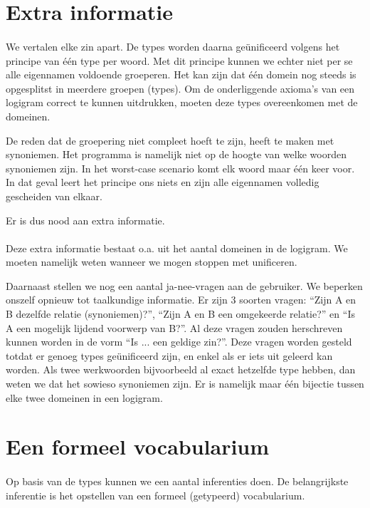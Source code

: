 \section{Extra informatie}
\paragraph{} We vertalen elke zin apart. De types worden daarna geünificeerd volgens het principe van één type per woord. Met dit principe kunnen we echter niet per se alle eigennamen voldoende groeperen. Het kan zijn dat één domein nog steeds is opgesplitst in meerdere groepen (types). Om de onderliggende axioma's van een logigram correct te kunnen uitdrukken, moeten deze types overeenkomen met de domeinen.

De reden dat de groepering niet compleet hoeft te zijn, heeft te maken met synoniemen. Het programma is namelijk niet op de hoogte van welke woorden synoniemen zijn. In het worst-case scenario komt elk woord maar één keer voor. In dat geval leert het principe ons niets en zijn alle eigennamen volledig gescheiden van elkaar.

Er is dus nood aan extra informatie.

\paragraph{} Deze extra informatie bestaat o.a. uit het aantal domeinen in de logigram. We moeten namelijk weten wanneer we mogen stoppen met unificeren.

Daarnaast stellen we nog een aantal ja-nee-vragen aan de gebruiker. We beperken onszelf opnieuw tot taalkundige informatie. Er zijn 3 soorten vragen: ``Zijn A en B dezelfde relatie (synoniemen)?'', ``Zijn A en B een omgekeerde relatie?'' en ``Is A een mogelijk lijdend voorwerp van B?''. Al deze vragen zouden herschreven kunnen worden in de vorm ``Is ... een geldige zin?''. Deze vragen worden gesteld totdat er genoeg types geünificeerd zijn, en enkel als er iets uit geleerd kan worden. Als twee werkwoorden bijvoorbeeld al exact hetzelfde type hebben, dan weten we dat het sowieso synoniemen zijn. Er is namelijk maar één bijectie tussen elke twee domeinen in een logigram.

\section{Een formeel vocabularium}
\paragraph{} Op basis van de types kunnen we een aantal inferenties doen. De belangrijkste inferentie is het opstellen van een formeel (getypeerd) vocabularium.

